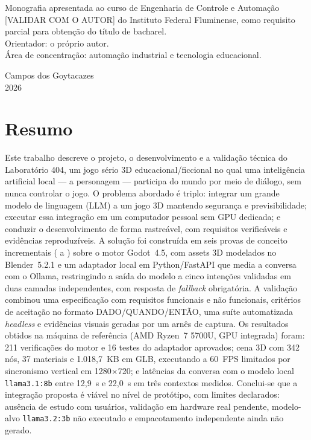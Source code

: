 \vspace{2.5cm}

\hfill
\begin{minipage}{8cm}
  \SingleSpacing
  \footnotesize
  Monografia apresentada ao curso de Engenharia de Controle e Automação
  [VALIDAR COM O AUTOR] do Instituto Federal Fluminense, como requisito
  parcial para obtenção do título de bacharel.\\
  Orientador: o próprio autor.\\
  Área de concentração: automação industrial e tecnologia educacional.
\end{minipage}

\vfill

\begin{center}
  Campos dos Goytacazes\\
  2026
\end{center}

\newpage

\chapter*{Resumo}

\SingleSpacing

Este trabalho descreve o projeto, o desenvolvimento e a validação técnica do
Laboratório 404, um jogo sério 3D educacional/ficcional no qual uma
inteligência artificial local --- a personagem \aria{} --- participa do mundo
por meio de diálogo, sem nunca controlar o jogo. O problema abordado é
triplo: integrar um grande modelo de linguagem (LLM) a um jogo 3D mantendo
segurança e previsibilidade; executar essa integração em um computador pessoal
sem GPU dedicada; e conduzir o desenvolvimento de forma rastreável, com
requisitos verificáveis e evidências reproduzíveis. A solução foi construída em
seis provas de conceito incrementais ( a ) sobre o motor Godot~4.5,
com assets 3D modelados no Blender~5.2.1 e um adaptador local em Python/FastAPI
que media a conversa com o Ollama, restringindo a saída do modelo a cinco
intenções validadas em duas camadas independentes, com resposta de
\emph{fallback} obrigatória. A validação combinou uma especificação com
requisitos funcionais e não funcionais, critérios de aceitação no formato
DADO/QUANDO/ENTÃO, uma suíte automatizada \emph{headless} e evidências visuais
geradas por um arnês de captura. Os resultados obtidos na máquina de referência
(AMD Ryzen~7 5700U, GPU integrada) foram: 211 verificações do motor e 16 testes
do adaptador aprovados; cena 3D com 342 nós, 37 materiais e 1.018,7~KB em GLB,
executando a 60~FPS limitados por sincronismo vertical em 1280$\times$720; e
latências da conversa com o modelo local \texttt{llama3.1:8b} entre 12,9~s e
22,0~s em três contextos medidos. Conclui-se que a integração proposta é viável
no nível de protótipo, com limites declarados: ausência de estudo com usuários,
validação em hardware real pendente, modelo-alvo \texttt{llama3.2:3b} não
executado e empacotamento independente ainda não gerado.

